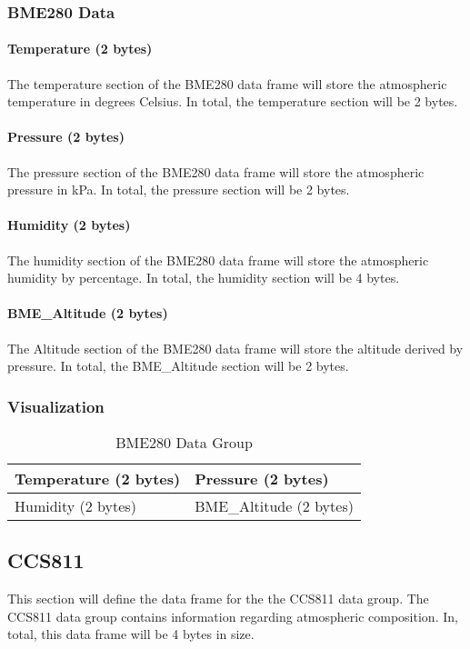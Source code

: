 \documentclass{article}
\begin{document}
  \subsubsection{BME280 Data}
  \paragraph{Temperature (2 bytes)}
  The temperature section of the BME280 data frame will store the atmospheric temperature in degrees Celsius. In total, the temperature section will be 2 bytes.
  \paragraph{Pressure (2 bytes)}
  The pressure section of the BME280 data frame will store the atmospheric pressure in kPa. In total, the pressure section will be 2 bytes.
  \paragraph{Humidity (2 bytes)}
  The humidity section of the BME280 data frame will store the atmospheric humidity by percentage. In total, the humidity section will be 4 bytes.
  \paragraph{BME\_Altitude (2 bytes)}
  The Altitude section of the BME280 data frame will store the altitude derived by pressure. In total, the BME\_Altitude section will be 2 bytes.
  \subsubsection{Visualization}
  
  \begin{table}[H]
  \centering
  \caption{BME280 Data Group}
  \label{my-label}
  \begin{tabular}{|l|l|}
  \hline
Temperature (2 bytes) & Pressure (2 bytes)      \\ \hline
Humidity (2 bytes)    & BME\_Altitude (2 bytes) \\ \hline
  \end{tabular}
  \end{table}
  
  \subsection{CCS811}
  This section will define the data frame for the the CCS811 data group. The CCS811 data group contains information regarding atmospheric composition. In,      total, this data frame will be 4 bytes in size.
\end{document}
